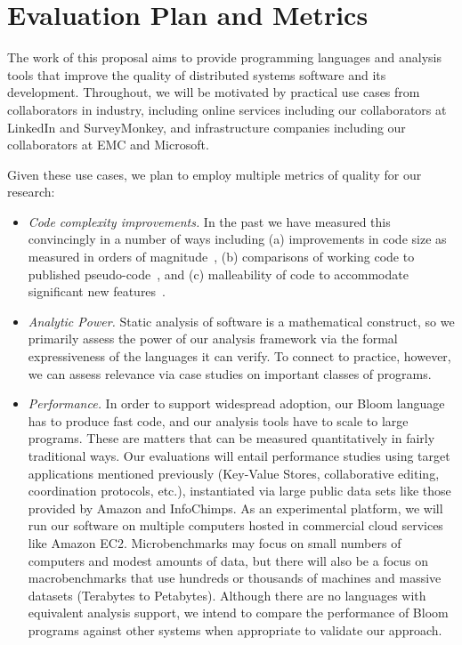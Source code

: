 \section{Evaluation Plan and Metrics}
The work of this proposal aims to provide programming languages and analysis tools that improve the quality of distributed systems software and its development.  Throughout, we will be motivated by practical use cases from collaborators in industry, including online services including our collaborators at LinkedIn and SurveyMonkey, and infrastructure companies including our collaborators at EMC and Microsoft.

Given these use cases, we plan to employ multiple metrics of quality for our research: 
\begin{itemize}
\item \emph{Code complexity improvements.}  In the past we have measured this convincingly in a number of ways including (a) improvements in code size as measured in orders of magnitude~\cite{boomanalytics,p2}, (b) comparisons of working code to published pseudo-code~\cite{boomanalytics,netdb}, and (c) malleability of code to accommodate significant new features~\cite{boomanalytics}.  

\item \emph{Analytic Power.}  Static analysis of software is a mathematical construct, so we primarily assess the power of our analysis framework via the formal expressiveness of the languages it can verify.  To connect to practice, however, we can assess relevance via case studies on important classes of programs.

\item \emph{Performance.}  In order to support widespread adoption, our Bloom language has to produce fast code, and our analysis tools have to scale to large programs.  These are matters that can be measured quantitatively in fairly traditional ways.  Our evaluations will entail performance studies using target applications mentioned previously  (Key-Value Stores, collaborative editing, coordination protocols, etc.), instantiated via large public data sets like those provided by Amazon and InfoChimps.  As an experimental platform, we will run our software on multiple computers hosted in commercial cloud services like Amazon EC2.  Microbenchmarks may focus on small numbers of computers and modest amounts of data, but there will also be a focus on macrobenchmarks that use hundreds or thousands of machines and massive datasets (Terabytes to Petabytes).  Although there are no languages with equivalent analysis support, we intend to compare the performance of Bloom programs against other systems when appropriate to validate our approach. 
\end{itemize}

